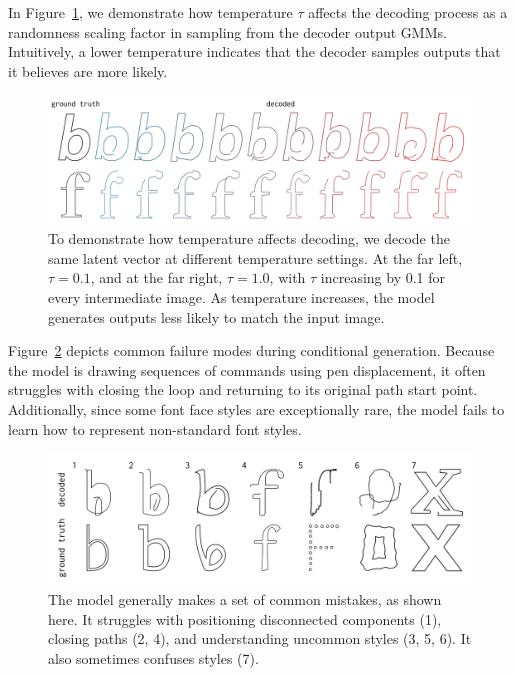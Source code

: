 In Figure~\ref{fig:temp}, we demonstrate how temperature $\tau$ affects the decoding process as a randomness scaling factor in sampling from the decoder output GMMs.
Intuitively, a lower temperature indicates that the decoder samples outputs that it believes are more likely.
\begin{figure}[h]
    \centering
	\includegraphics[width=\textwidth]{figures/temp_grid}
    \caption[The temperature grid for a conditionally generated glyph]
    {To demonstrate how temperature affects decoding, we decode the same latent vector at different temperature settings.
    At the far left, $\tau=0.1$, and at the far right, $\tau=1.0$, with $\tau$ increasing by 0.1 for every intermediate image.
    As temperature increases, the model generates outputs less likely to match the input image.
    \label{fig:temp}}
\end{figure}

Figure~\ref{fig:fails} depicts common failure modes during conditional generation.
Because the model is drawing sequences of commands using pen displacement, it often struggles with closing the loop and returning to its original path start point.
Additionally, since some font face styles are exceptionally rare, the model fails to learn how to represent non-standard font styles.
\begin{figure}[h]
    \centering
	\includegraphics[width=\textwidth]{figures/fails}
    \caption[Common failure cases for conditional generation]
    {The model generally makes a set of common mistakes, as shown here.
    It struggles with positioning disconnected components (1), closing paths (2, 4), and understanding uncommon styles (3, 5, 6). It also sometimes confuses styles (7).\label{fig:fails}}
\end{figure}
\newpage

